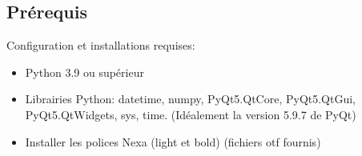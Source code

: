 \subsection{Prérequis}

Configuration et installations requises:

\begin{itemize}
    \item Python 3.9 ou supérieur
    \item Librairies Python: datetime, numpy, PyQt5.QtCore, PyQt5.QtGui, PyQt5.QtWidgets, sys, time.
     (Idéalement la version 5.9.7 de PyQt) 
    \item Installer les polices Nexa (light et bold) (fichiers otf fournis)
\end{itemize}
